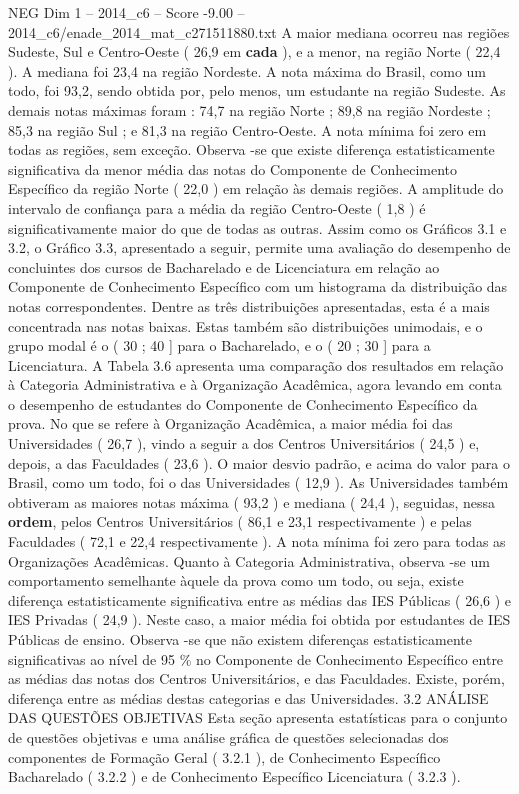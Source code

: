 \begin{textsample}{NEG Dim 1 – 2014\_c6 – Score -9.00 – 2014\_c6/enade\_2014\_mat\_c271511880.txt}
A maior mediana ocorreu nas regiões Sudeste, Sul e Centro-Oeste ( 26,9 em \textbf{cada} ), e a menor, na região Norte ( 22,4 ).
A mediana foi 23,4 na região Nordeste.
A nota máxima do Brasil, como um todo, foi 93,2, sendo obtida por, pelo menos, um estudante na região Sudeste.
As demais notas máximas foram : 74,7 na região Norte ; 89,8 na região Nordeste ; 85,3 na região Sul ; e 81,3 na região Centro-Oeste.
A nota mínima foi zero em todas as regiões, sem exceção.
Observa -se que existe diferença estatisticamente significativa da menor média das notas do Componente de Conhecimento Específico da região Norte ( 22,0 ) em relação às demais regiões.
A amplitude do intervalo de confiança para a média da região Centro-Oeste ( 1,8 ) é significativamente maior do que de todas as outras.
Assim como os Gráficos 3.1 e 3.2, o Gráfico 3.3, apresentado a seguir, permite uma avaliação do desempenho de concluintes dos cursos de Bacharelado e de Licenciatura em relação ao Componente de Conhecimento Específico com um histograma da distribuição das notas correspondentes.
Dentre as três distribuições apresentadas, esta é a mais concentrada nas notas baixas.
Estas também são distribuições unimodais, e o grupo modal é o ( 30 ; 40 ] para o Bacharelado, e o ( 20 ; 30 ] para a Licenciatura.
A Tabela 3.6 apresenta uma comparação dos resultados em relação à Categoria Administrativa e à Organização Acadêmica, agora levando em conta o desempenho de estudantes do Componente de Conhecimento Específico da prova.
No que se refere à Organização Acadêmica, a maior média foi das Universidades ( 26,7 ), vindo a seguir a dos Centros Universitários ( 24,5 ) e, depois, a das Faculdades ( 23,6 ).
O maior desvio padrão, e acima do valor para o Brasil, como um todo, foi o das Universidades ( 12,9 ).
As Universidades também obtiveram as maiores notas máxima ( 93,2 ) e mediana ( 24,4 ), seguidas, nessa \textbf{ordem}, pelos Centros Universitários ( 86,1 e 23,1 respectivamente ) e pelas Faculdades ( 72,1 e 22,4 respectivamente ).
A nota mínima foi zero para todas as Organizações Acadêmicas.
Quanto à Categoria Administrativa, observa -se um comportamento semelhante àquele da prova como um todo, ou seja, existe diferença estatisticamente significativa entre as médias das IES Públicas ( 26,6 ) e IES Privadas ( 24,9 ).
Neste caso, a maior média foi obtida por estudantes de IES Públicas de ensino.
Observa -se que não existem diferenças estatisticamente significativas ao nível de 95 \% no Componente de Conhecimento Específico entre as médias das notas dos Centros Universitários, e das Faculdades.
Existe, porém, diferença entre as médias destas categorias e das Universidades. 3.2 ANÁLISE DAS QUESTÕES OBJETIVAS Esta seção apresenta estatísticas para o conjunto de questões objetivas e uma análise gráfica de questões selecionadas dos componentes de Formação Geral ( 3.2.1 ), de Conhecimento Específico Bacharelado ( 3.2.2 ) e de Conhecimento Específico Licenciatura ( 3.2.3 ).

\end{textsample}
